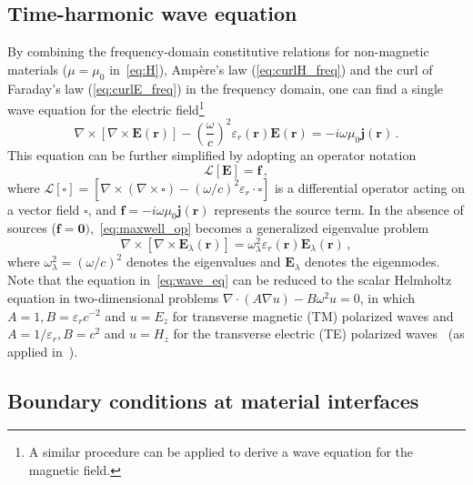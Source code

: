 \subsection*{Time-harmonic wave equation}
By combining the frequency-domain constitutive relations for non-magnetic materials ($\mu=\mu_0$ in~\eqref{eq:H}), Ampère's law
(\eqref{eq:curlH_freq}) and the curl
of Faraday's law (\eqref{eq:curlE_freq}) in the frequency domain,
one can find a single wave equation for the electric
field\footnote{A similar procedure can be applied to derive a wave equation
for the magnetic field.}
\begin{equation}\label{eq:wave_eq}
       \nabla \times \left[\nabla \times
\mathbf{E}(\mathbf{r})\right] - \left( \frac{\omega}{c} \right)^2
       \varepsilon_r(\mathbf{r}) \mathbf{E}(\mathbf{r}) = -i\omega \mu_0
\mathbf{j}(\mathbf{r})\,.
   \end{equation}
This equation can be further simplified by adopting an operator notation
\begin{equation}\label{eq:maxwell_op}
      \mathcal{L}[\mathbf{E}] = \mathbf{f}\,,
\end{equation}
where $\mathcal{L}[\square] = [ \nabla \times \left( \nabla \times
\mathbf{\square} \right) - \left(\omega/c \right)^2 \varepsilon_r \cdot \square] $ is a differential
operator acting on a vector field $\mathbf{\square}$,
and $\mathbf{f} = -i\omega \mu_0 \mathbf{j}(\mathbf{r})$ represents the source
term. In the absence of sources ($\mathbf{f}=\mathbf{0})$,~\eqref{eq:maxwell_op} becomes a generalized eigenvalue problem
\begin{equation}\label{eq:gen_eigen}
   \nabla \times \left[\nabla \times
   \mathbf{E}_\lambda(\mathbf{r})\right] = \omega_\lambda^2 \varepsilon_r(\mathbf{r}) \mathbf{E}_\lambda(\mathbf{r})\,,
\end{equation}
where $\omega_\lambda^2=(\omega/c)^2$ denotes the eigenvalues and $\mathbf{E}_\lambda$ denotes the eigenmodes. Note that the equation in~\eqref{eq:wave_eq} can be reduced to the scalar Helmholtz equation in
two-dimensional problems $\nabla \cdot(A \nabla u) - B \omega^2 u=0$, in which
$A=1, B=\varepsilon_r c^{-2}$ and $u=E_z$ for
transverse magnetic (TM) polarized waves and $A=1 / \varepsilon_r, B=c^2$ and
$u=H_z$ for the transverse electric (TE) polarized waves~\cite{jensen_review} (as applied in~\cite{ownpub2}).

    \subsection*{Boundary conditions at material interfaces}

